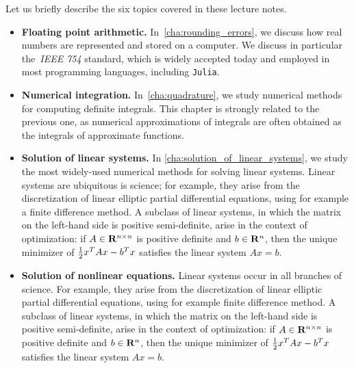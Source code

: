 Let us briefly describe the six topics covered in these lecture notes.
\begin{itemize}
    \item
        \textbf{Floating point arithmetic.}
        In~\cref{cha:rounding_errors},
        we discuss how real numbers are represented and stored on a computer.
        We discuss in particular the~\emph{IEEE 754} standard, which is widely accepted today
        and employed in most programming languages, including \texttt{Julia}.

    \item
        \textbf{Numerical integration.}
        In~\cref{cha:quadrature},
        we study numerical methods for computing definite integrals.
        This chapter is strongly related to the previous one,
        as numerical approximations of integrals are often obtained as the integrals of approximate functions.

    \item
        \textbf{Solution of linear systems.}
        In \cref{cha:solution_of_linear_systems},
        we study the most widely-used numerical methods for solving linear systems.
        Linear systems are ubiquitous is science;
        for example, they arise from the discretization of linear elliptic partial differential equations,
        using for example a finite difference method.
        A subclass of linear systems, in which the matrix on the left-hand side is positive semi-definite,
        arise in the context of optimization:
        if $A \in \mathbf R^{n \times n}$ is positive definite and $b \in \mathbf R^n$,
        then the unique minimizer of $\frac{1}{2} x^T A x - b^T x$ satisfies the linear system $A x = b$.

    \item
        \textbf{Solution of nonlinear equations.}
        Linear systems occur in all branches of science.
        For example, they arise from the discretization of linear elliptic partial differential equations,
        using for example finite difference method.
        A subclass of linear systems, in which the matrix on the left-hand side is positive semi-definite,
        arise in the context of optimization:
        if $A \in \mathbf R^{n \times n}$ is positive definite and $b \in \mathbf R^n$,
        then the unique minimizer of $\frac{1}{2} x^T A x - b^T x$ satisfies the linear system $A x = b$.
\end{itemize}

